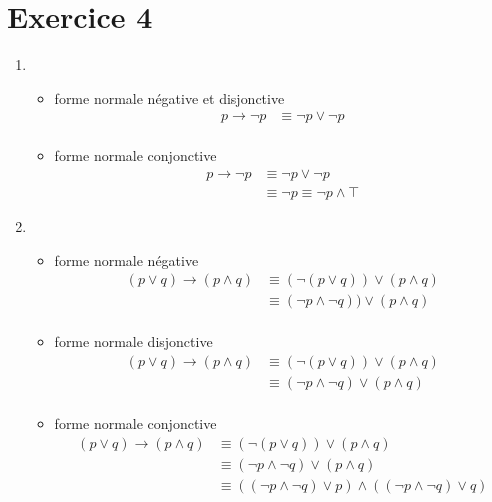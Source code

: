 \documentclass[12pt]{report}
\begin{document}
\section{Exercice 4}

\begin{enumerate}
  \item \begin{itemize}
    \item  forme normale négative et disjonctive
          \begin{align*}
            p \to \neg p & \equiv \neg p \vee \neg p\\
          \end{align*}
    \item forme normale conjonctive
          \begin{align*}
            p \to \neg p & \equiv \neg p \vee \neg p\\
            & \equiv \neg p \equiv \neg p \wedge \top
          \end{align*}
        \end{itemize}
  \item \begin{itemize}
    \item forme normale négative
          \begin{align*}
            (p \vee q) \to (p \wedge q) & \equiv (\neg (p \vee q)) \vee (p \wedge q)\\
            & \equiv (\neg p \wedge \neg q)) \vee (p \wedge q)\\
          \end{align*}
          \item forme normale disjonctive
                \begin{align*}
                  (p \vee q) \to (p \wedge q) & \equiv (\neg (p \vee q)) \vee (p \wedge q)\\
                  & \equiv (\neg p \wedge \neg q) \vee (p \wedge q)\\
                \end{align*}
          \item forme normale conjonctive
                \begin{align*}
                    (p \vee q) \to (p \wedge q) & \equiv (\neg (p \vee q)) \vee (p \wedge q)\\
                    & \equiv (\neg p \wedge \neg q) \vee (p \wedge q)\\
                    & \equiv ((\neg p \wedge \neg q) \vee p) \wedge ((\neg p \wedge \neg q) \vee q)\\

\end{align*}
\end{itemize}
\end{enumerate}
\end{document}
